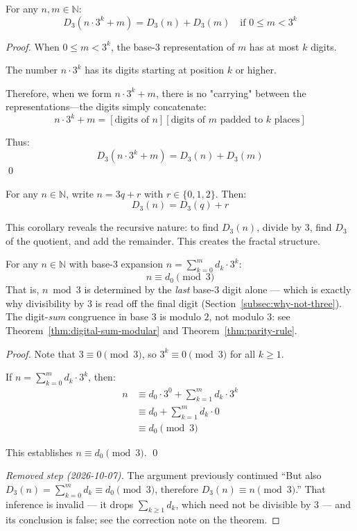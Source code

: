 \begin{theorem}
\label{thm:d3-addition}
For any $n, m \in \mathbb{N}$:
$$D_3(n \cdot 3^k + m) = D_3(n) + D_3(m) \quad \text{if } 0 \leq m < 3^k$$
\end{theorem}

\begin{proof}
When $0 \leq m < 3^k$, the base-3 representation of $m$ has at most $k$ digits.

The number $n \cdot 3^k$ has its digits starting at position $k$ or higher.

Therefore, when we form $n \cdot 3^k + m$, there is no "carrying" between the representations—the digits simply concatenate:
$$n \cdot 3^k + m = [\text{digits of } n][\text{digits of } m \text{ padded to } k \text{ places}]$$

Thus:
$$D_3(n \cdot 3^k + m) = D_3(n) + D_3(m)$$
\qed
\end{proof}

\begin{corollary}
For any $n \in \mathbb{N}$, write $n = 3q + r$ with $r \in \{0,1,2\}$. Then:
$$D_3(n) = D_3(q) + r$$
\end{corollary}

This corollary reveals the recursive nature: to find $D_3(n)$, divide by 3, find $D_3$ of the quotient, and add the remainder. This creates the fractal structure.

\begin{theorem}
\label{thm:d3-modular}
For any $n \in \mathbb{N}$ with base-3 expansion $n = \sum_{k=0}^{m} d_k \cdot 3^k$:
$$n \equiv d_0 \pmod{3}$$
That is, $n \bmod 3$ is determined by the \emph{last} base-3 digit alone --- which
is exactly why divisibility by 3 is read off the final digit
(Section~\ref{subsec:why-not-three}). The digit-\emph{sum} congruence in base 3 is
modulo $2$, not modulo $3$: see Theorem~\ref{thm:digital-sum-modular} and
Theorem~\ref{thm:parity-rule}.
\end{theorem}

\begin{proof}
Note that $3 \equiv 0 \pmod{3}$, so $3^k \equiv 0 \pmod{3}$ for all $k \geq 1$.

If $n = \sum_{k=0}^{m} d_k \cdot 3^k$, then:
\begin{align}
n &\equiv d_0 \cdot 3^0 + \sum_{k=1}^{m} d_k \cdot 3^k \\
&\equiv d_0 + \sum_{k=1}^{m} d_k \cdot 0 \\
&\equiv d_0 \pmod{3}
\end{align}

This establishes $n \equiv d_0 \pmod{3}$. \qed

\medskip
\noindent\emph{Removed step (2026-10-07).} The argument previously continued
``But also $D_3(n) = \sum_{k=0}^{m} d_k \equiv d_0 \pmod 3$, therefore
$D_3(n) \equiv n \pmod 3$.'' That inference is invalid --- it drops
$\sum_{k \ge 1} d_k$, which need not be divisible by 3 --- and its conclusion is
false; see the correction note on the theorem.
\end{proof}

